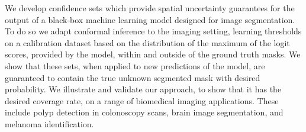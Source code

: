 We develop confidence sets which provide spatial uncertainty guarantees for the output of a black-box machine learning model designed for image segmentation. To do so we adapt conformal inference to the imaging setting, learning thresholds  on a calibration dataset based on the distribution of the maximum of the logit scores, provided by the model, within and outside of the ground truth masks. We show that these sets, when applied to new predictions of the model, are guaranteed to contain the true unknown segmented mask with desired probability. We illustrate and validate our approach, to show that it has the desired coverage rate, on a range of biomedical imaging applications. These include polyp detection in colonoscopy scans, brain image segmentation, and melanoma identification.